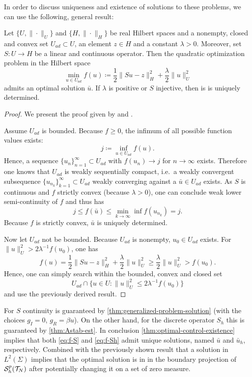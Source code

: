 \documentclass[../thesis.tex]{subfiles}
\begin{document}
In order to discuss uniqueness and existence of solutions to these problems, we can use the following, general result:
\begin{theorem}
\label{thm:optimal-control-existence}
Let $\{ U, \| \cdot \|_U \}$ and $\{ H, \| \cdot \|_H \}$ be real Hilbert spaces and a nonempty, closed and convex set $U_{ad} \subset U$, an element $z \in H$ and a constant $\lambda > 0$.
Moreover, set $S : U \to H$ be a linear and continuous operator.
Then the quadratic optimization problem in the Hilbert space
\[
	\min_{u \in U_{ad}} f(u) \coloneqq \frac{1}{2} \| Su - z \|_H^2 + \frac{\lambda}{2} \| u \|_U^2
\]
admits an optimal solution $\bar{u}$. If $\lambda$ is positive or $S$ injective, then is is uniquely determined.
\end{theorem}
\begin{proof}
We present the proof given by \cite[Satz 2.14]{Troeltzsch} and \cite[Satz 2.15]{Troeltzsch}.

Assume $U_{ad}$ is bounded. Because $f \geq 0$, the infimum of all possible function values exists:
\[
	j \coloneqq \inf_{u \in U_{ad}} f(u).
\]
Hence, a sequence $\{ u_n \}_{n=1}^\infty \subset U_{ad}$ with $f(u_n) \to j$ for $n \to \infty$ exists.
Therefore one knows that $U_{ad}$ is weakly sequentially compact, i.e.\ a weakly convergent subsequence $\{ u_{n_k} \}_{k=1}^\infty \subset U_{ad}$ weakly converging against a $\bar{u} \in U_{ad}$ exists.
As $S$ is continuous and $f$ strictly convex (because $\lambda > 0$), one can conclude weak lower semi-continuity of $f$ and thus has
\[
	j \leq f(\bar{u}) \leq \min_{k \to \infty} \inf f(u_{n_k}) = j.
\]
Because $f$ is strictly convex, $\bar{u}$ is uniquely determined.

Now let $U_{ad}$ not be bounded. Because $U_{ad}$ is nonempty, $u_0 \in U_{ad}$ exists. For $\| u \|_U^2 > 2 \lambda^{-1} f(u_0)$, one has
\[
	f(u) = \frac{1}{2} \| S u - z \|_H^2 + \frac{\lambda}{2} \| u \|_U^2 \geq \frac{\lambda}{2} \| u \|_U^2 > f(u_0).
\]
Hence, one can simply search within the bounded, convex and closed set
\[
	U_{ad} \cap \{ u \in U : \| u \|_U^2 \leq 2 \lambda^{-1} f(u_0) \}
\]
and use the previously derived result.
\end{proof}
For $S$ continuity is guaranteed by \cref{thm:generalized-problem-solution} (with the choices $g_I = 0$, $g_R = \beta u$).
On the other hand, for the discrete operator $S_h$ this is guaranteed by \cref{thm:Astab-est}.
In conclusion \cref{thm:optimal-control-existence} implies that both \cref{eq:f-S} and \cref{eq:f-Sh} admit unique solutions, named $\bar{u}$ and $\bar{u}_h$, respectively.
Combined with the previously shown result that a solution in $L^2(\Sigma)$ implies that the optimal solution is in in the boundary projection of $\mathcal{S}_h^p(\mathcal{T}_N)$ after potentially changing it on a set of zero measure.
\end{document}
